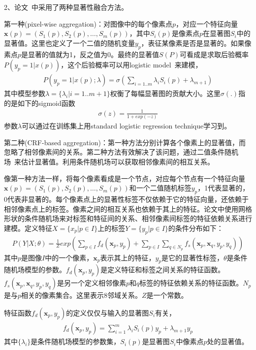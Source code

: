 \documentclass[12pt]{article}
\begin{document}
2、论文~\cite{mai2013saliency}中采用了两种显著性融合方法。

第一种(pixel-wise aggregation)：对图像中的每个像素点$p$，对应一个特征向量$\textbf{x}(p) = (S_1(p), S_2(p), \ldots, S_m(p))$，其中$S_i(p)$是像素点$p$在显著图$S_i$中的显著值。这里也定义了一个二值的随机变量$y_p$，表征某像素是否是显著的。如果像素点$p$是显著的值就为1，反之值为0。最终的显著值$S(P)$可看成是求取后验概率$P(y_p = 1|x(p))$，这个后验概率可以用logistic model~\cite{bishop2006pattern}来建模，
\begin{align}
P(y_p=1|x(p);\lambda)=\sigma(\sum_{i=1..m}\lambda_i S_i(p)+\lambda_{m+1})
\end{align}
其中模型参数$\lambda = \{\lambda_i|i=1..m+1\}$权衡了每幅显著图的贡献大小。这里$\sigma(.)$指的是如下的sigmoid函数
\begin{align}
\sigma(z) = \frac{1}{1+exp(-z)}
\end{align}
参数$\lambda$可以通过在训练集上用standard logistic regression technique学习到。

第二种(CRF-based aggregation)：第一种方法分别计算各个像素上的显著值，而忽略了相邻像素间的关系。第二种方法有效解决了该问题，通过二值条件随机场~\cite{lafferty2001conditional}来估计显著值。利用条件随机场可以获取相邻像素间的相互关系。

像第一种方法一样，将每个像素看成是一个节点，对应每个节点有一个特征向量$\textbf{x}(p) = (S_1(p), S_2(p), \ldots, S_m(p))$和一个二值随机标签$y_p$，1代表显著的，0代表非显著的。每个像素点上的显著性标签不仅依赖于它的特征向量，还依赖于相邻像素点上的标签。像素之间的相互关系也依赖于其上的特征。论文中使用网格形状的条件随机场来对标签和特征间的关系、相邻像素间标签的特征依赖关系进行建模。定义特征$X=\{x_p|p\in I\}$上的标签$Y=\{y_p|p \in I\}$的条件分布如下：
\begin{align}
P(Y|X;\theta) = \frac{1}{Z}exp(\sum_{p\in I}f_d(\textbf{x}_p, y_p)+\sum_{p \in I}\sum_{q\in N_p}f_s(\textbf{x}_p, \textbf{x}_q, y_p, y_q))
\end{align}
其中$p$是图像$I$中的一个像素，$\textbf{x}_p$表示其上的特征，$y_p$是它的显著性标签，$\theta$是条件随机场模型的参数。$f_d(\textbf{x}_p, y_p)$是定义特征和标签之间关系的特征函数。$f_s(\textbf{x}_p, \textbf{x}_q, y_p, y_q)$是另一个定义相邻像素$p$和$q$标签的特征依赖关系的特征函数。$N_p$是与$p$相关的像素集合。这里表示8邻域关系。$Z$是一个常数。

特征函数$f_d(\textbf{x}_p, y_p)$的定义仅仅与输入的显著图$S_i$有关，
\begin{align}
f_d(\textbf{x}_p, y_p) = \sum_{i=1}^{m}\lambda_iS_i(p)y_p+\lambda_{m+1}y_p
\end{align}
其中$\{\lambda_i\}$是条件随机场模型的参数集，$S_i(p)$是显著图$S_i$中像素点$p$处的显著值。
\end{document}
